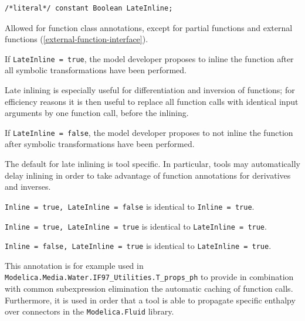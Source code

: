\begin{annotationdefinition}[LateInline]
\begin{synopsis}\begin{lstlisting}
/*literal*/ constant Boolean LateInline;
\end{lstlisting}\end{synopsis}
\begin{semantics}
Allowed for function class annotations, except for partial functions and external functions (\cref{external-function-interface}).

If {\lstinline!LateInline = true!}, the model developer proposes to inline the function after all symbolic transformations have been performed.

\begin{nonnormative}
Late inlining is especially useful for differentiation and inversion of functions; for efficiency reasons it is then useful to replace all function calls with identical input arguments by one function call, before the inlining.
\end{nonnormative}

If {\lstinline!LateInline = false!}, the model developer proposes to not inline the function after symbolic transformations have been performed.

The default for late inlining is tool specific.
In particular, tools may automatically delay inlining in order to take advantage of function annotations for derivatives and inverses.

{\lstinline!Inline = true, LateInline = false!} is identical to {\lstinline!Inline = true!}.

{\lstinline!Inline = true, LateInline = true!} is identical to {\lstinline!LateInline = true!}.

{\lstinline!Inline = false, LateInline = true!} is identical to {\lstinline!LateInline = true!}.

\begin{nonnormative}
This annotation is for example used in {\lstinline!Modelica.Media.Water.IF97_Utilities.T_props_ph!} to provide in combination with common subexpression elimination the automatic caching of function calls.
Furthermore, it is used in order that a tool is able to propagate specific enthalpy over connectors in the {\lstinline!Modelica.Fluid!} library.
\end{nonnormative}
\end{semantics}
\end{annotationdefinition}

